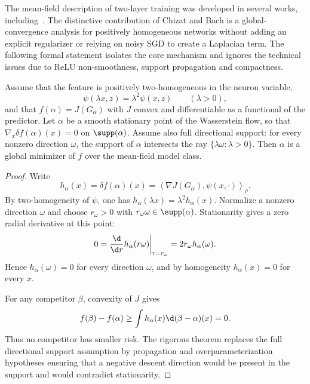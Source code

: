 The mean-field description of two-layer training was developed in several works, including~\cite{ChizatBach2018OverparameterizedOT,MeiMontanariNguyen2018MeanFieldNN}. The distinctive contribution of Chizat and Bach is a global-convergence analysis for positively homogeneous networks without adding an explicit regularizer or relying on noisy SGD to create a Laplacian term. The following formal statement isolates the core mechanism and ignores the technical issues due to ReLU non-smoothness, support propagation and compactness.

\begin{prop}\label{prop-formal-chizat-bach}
	Assume that the feature is positively two-homogeneous in the neuron variable,
	\[
		\psi(\lambda x,z)=\lambda^2\psi(x,z)
		\qquad(\lambda>0),
	\]
	and that $f(\alpha)=J(G_\alpha)$ with $J$ convex and differentiable as a functional of the predictor. Let $\alpha$ be a smooth stationary point of the Wasserstein flow, so that $\nabla_x\delta f(\alpha)(x)=0$ on $\supp(\alpha)$. Assume also full directional support: for every nonzero direction $\omega$, the support of $\alpha$ intersects the ray $\{\lambda\omega:\lambda>0\}$. Then $\alpha$ is a global minimizer of $f$ over the mean-field model class.
\end{prop}
\begin{proof}
	Write
	\[
		h_\alpha(x)=\delta f(\alpha)(x)
		=
		\left\langle \nabla J(G_\alpha),\psi(x,\cdot)\right\rangle_\rho .
	\]
	By two-homogeneity of $\psi$, one has $h_\alpha(\lambda x)=\lambda^2h_\alpha(x)$. Normalize a nonzero direction $\omega$ and choose $r_\omega>0$ with $r_\omega\omega\in\supp(\alpha)$. Stationarity gives a zero radial derivative at this point:
	\[
		0=\frac{\d}{\d r}h_\alpha(r\omega)\bigg|_{r=r_\omega}
		=2r_\omega h_\alpha(\omega).
	\]
	Hence $h_\alpha(\omega)=0$ for every direction $\omega$, and by homogeneity $h_\alpha(x)=0$ for every $x$.

	For any competitor $\beta$, convexity of $J$ gives
	\[
		f(\beta)-f(\alpha)
		\geq
		\int h_\alpha(x)\d(\beta-\alpha)(x)=0.
	\]
	Thus no competitor has smaller risk. The rigorous theorem replaces the full directional support assumption by propagation and overparameterization hypotheses ensuring that a negative descent direction would be present in the support and would contradict stationarity.
\end{proof}
